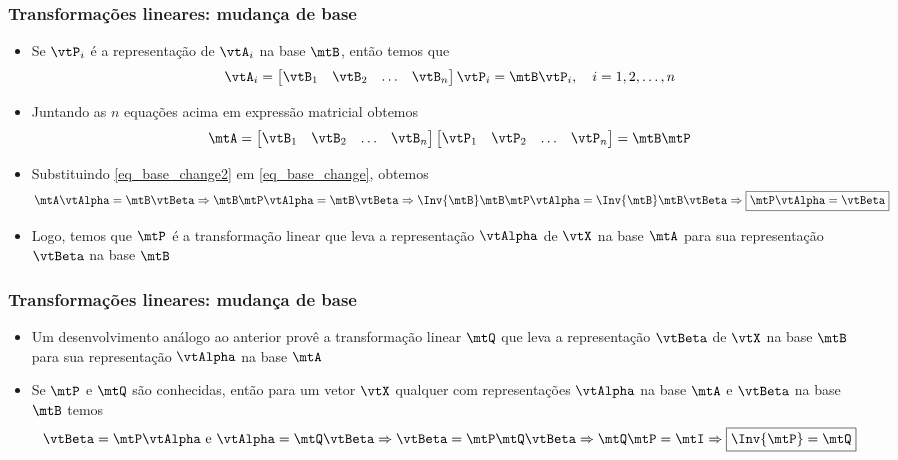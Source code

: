 \begin{frame}
  \frametitle{Transformações lineares: mudança de base}
  \begin{itemize}
    \item Se $\vtP_i$ é a representação de $\vtA_i$ na base $\mtB$, então temos que
    \begin{equation}
      \vtA_i = \left[\begin{matrix}\vtB_1 & \vtB_2 & \ldots & \vtB_n\end{matrix}\right]\vtP_i = \mtB\vtP_i,\quad i = 1, 2, \ldots, n
    \end{equation}
    \item Juntando as $n$ equações acima em expressão matricial obtemos
    \begin{equation}\label{eq_base_change2}
      \mtA = \left[\begin{matrix}\vtB_1 & \vtB_2 & \ldots & \vtB_n\end{matrix}\right]\left[\begin{matrix}\vtP_1 & \vtP_2 & \ldots & \vtP_n\end{matrix}\right] = \mtB\mtP
    \end{equation}
    \item Substituindo \eqref{eq_base_change2} em \eqref{eq_base_change}, obtemos
    \begin{equation*}
        \mtA\vtAlpha = \mtB\vtBeta \Rightarrow \mtB\mtP\vtAlpha = \mtB\vtBeta \Rightarrow \Inv{\mtB}\mtB\mtP\vtAlpha = \Inv{\mtB}\mtB\vtBeta \Rightarrow \boxed{\mtP\vtAlpha = \vtBeta}
    \end{equation*}
    \item Logo, temos que $\mtP$ é a transformação linear que leva a representação $\vtAlpha$ de $\vtX$ na base $\mtA$ para sua representação $\vtBeta$ na base $\mtB$
  \end{itemize}
\end{frame}

\begin{frame}
  \frametitle{Transformações lineares: mudança de base}
  \begin{itemize}
    \item Um desenvolvimento análogo ao anterior provê a transformação linear $\mtQ$ que leva a representação $\vtBeta$ de $\vtX$ na base $\mtB$ para sua representação $\vtAlpha$ na base $\mtA$
    \item Se $\mtP$ e $\mtQ$ são conhecidas, então para um vetor $\vtX$ qualquer com representações $\vtAlpha$ na base $\mtA$ e $\vtBeta$ na base $\mtB$ temos
    \begin{equation*}
      \vtBeta = \mtP\vtAlpha \text{ e } \vtAlpha = \mtQ\vtBeta \Rightarrow \vtBeta = \mtP\mtQ\vtBeta \Rightarrow \mtQ\mtP = \mtI \Rightarrow \boxed{\Inv{\mtP} = \mtQ}
    \end{equation*}
  \end{itemize}
\end{frame}


